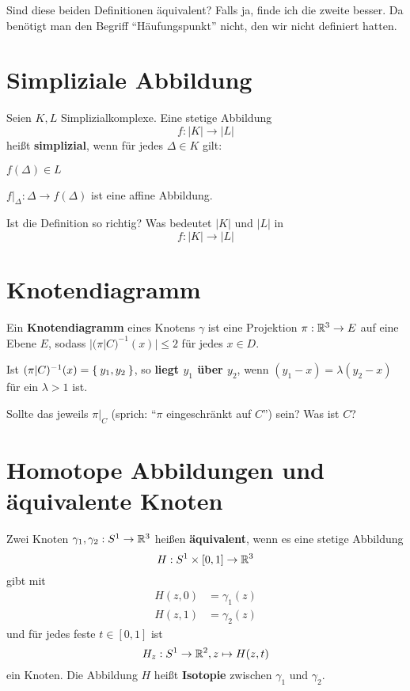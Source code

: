 \documentclass[a5paper,oneside]{scrbook}
\begin{document}
Sind diese beiden Definitionen äquivalent? Falls ja, finde ich die 
zweite besser. Da benötigt man den Begriff \enquote{Häufungspunkt}
nicht, den wir nicht definiert hatten.

\section{Simpliziale Abbildung}
\begin{definition}
    Seien $K, L$ Simplizialkomplexe. Eine stetige Abbildung
    \[f:|K| \rightarrow |L|\]
    heißt \textbf{simplizial}, wenn für
    jedes $\Delta \in K$ gilt:
    \begin{defenum}
        \item $f(\Delta) \in L$
        \item $f|_{\Delta} : \Delta \rightarrow f(\Delta)$ ist eine
              affine Abbildung.
    \end{defenum}
\end{definition}

Ist die Definition so richtig? Was bedeutet $|K|$ und $|L|$ in
    \[f:|K| \rightarrow |L|\]

\section{Knotendiagramm}
\begin{definition}%
    Ein \textbf{Knotendiagramm} eines Knotens $\gamma$ ist eine 
    Projektion $\pi: \mathbb{R}^3 \rightarrow E$ auf eine Ebene $E$, sodass
    $|(\pi|C)^{-1}(x)| \leq 2$ für jedes $x \in D$.

    Ist $(\pi|C)^{-1}(x) = \Set{y_1, y_2}$, so \textbf{liegt $y_1$ über $y_2$},
    wenn $(y_1-x) = \lambda (y_2 - x)$ für ein $\lambda > 1$ ist.
\end{definition}

Sollte das jeweils $\pi|_C$ (sprich: \enquote{$\pi$ eingeschränkt auf $C$})
sein? Was ist $C$?

\section{Homotope Abbildungen und äquivalente Knoten}
\begin{definition}
    Zwei Knoten $\gamma_1, \gamma_2: S^1 \rightarrow \mathbb{R}^3$ heißen
    \textbf{äquivalent}, wenn es eine stetige Abbildung
    \[H: S^1 \times [0,1] \rightarrow \mathbb{R}^3\]
    gibt mit 
    \begin{align*}
        H(z,0) &= \gamma_1(z)\\
        H(z,1) &= \gamma_2(z)
    \end{align*}
    und für jedes
    feste $t \in [0,1]$ ist 
    \[H_z: S^1 \rightarrow \mathbb{R}^2, z \mapsto H(z,t)\]
    ein Knoten. Die Abbildung $H$ heißt \textbf{Isotopie} zwischen
    $\gamma_1$ und $\gamma_2$.
\end{definition}
\end{document}
